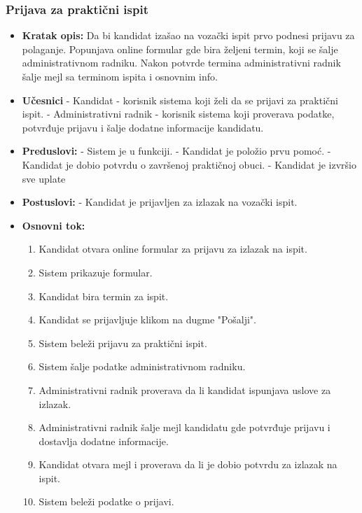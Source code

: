\subsubsection{Prijava za praktični ispit}

\vspace{3mm}

\begin{itemize}

\item \textbf{Kratak opis:} Da bi kandidat izašao na vozački ispit prvo podnesi prijavu za polaganje. Popunjava online formular gde bira željeni termin, koji se  šalje administrativnom radniku. Nakon potvrde termina administrativni radnik šalje mejl sa terminom ispita i osnovnim info.

\vspace{2mm}

\item \textbf{Učesnici} \newline
   - Kandidat - korisnik sistema koji želi da se prijavi za praktični ispit.\newline   
   - Administrativni radnik - korisnik sistema koji proverava podatke, potvrđuje prijavu i šalje dodatne informacije kandidatu. 
   
\item \textbf{Preduslovi:} \newline
   - Sistem je u funkciji. \newline
   - Kandidat je položio prvu pomoć. \newline
   - Kandidat je dobio potvrdu o završenoj praktičnoj obuci. \newline
   - Kandidat je izvršio sve uplate

\item \textbf{Postuslovi:} \newline
    - Kandidat je prijavljen za izlazak na vozački ispit.

\item \textbf{Osnovni tok:}  
   \begin{enumerate}
   \item Kandidat otvara online formular za prijavu za izlazak na ispit.
   \item Sistem prikazuje formular.
   \item Kandidat bira termin za ispit.
   \item Kandidat se prijavljuje klikom na dugme "Pošalji".
   \item Sistem beleži prijavu za praktični ispit.
   \item Sistem šalje podatke administrativnom radniku.
   \item Administrativni radnik proverava da li kandidat ispunjava uslove za izlazak.
   \item Administrativni radnik šalje mejl kandidatu gde potvrđuje prijavu i dostavlja dodatne informacije.
   \item Kandidat otvara mejl i proverava da li je dobio potvrdu za izlazak na ispit. 
   \item Sistem beleži podatke o prijavi. 
   \end{enumerate}


\end{itemize}
